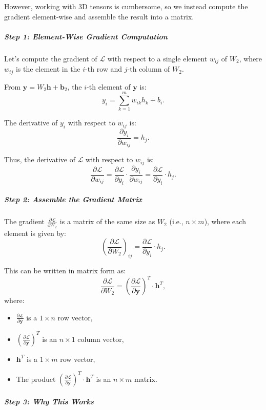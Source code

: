 \begin{notechapter}
However, working with 3D tensors is cumbersome, so we instead compute the gradient element-wise and assemble the result into a matrix.

\subparagraph*{Step 1: Element-Wise Gradient Computation}
Let’s compute the gradient of \( \mathcal{L} \) with respect to a single element \( w_{ij} \) of \( W_2 \), where \( w_{ij} \) is the element in the \( i \)-th row and \( j \)-th column of \( W_2 \).

From \( \mathbf{y} = W_2 \mathbf{h} + \mathbf{b}_2 \), the \( i \)-th element of \( \mathbf{y} \) is:
\[
y_i = \sum_{k=1}^m w_{ik} h_k + b_i.
\]

The derivative of \( y_i \) with respect to \( w_{ij} \) is:
\[
\frac{\partial y_i}{\partial w_{ij}} = h_j.
\]

Thus, the derivative of \( \mathcal{L} \) with respect to \( w_{ij} \) is:
\[
\frac{\partial \mathcal{L}}{\partial w_{ij}} = \frac{\partial \mathcal{L}}{\partial y_i} \cdot \frac{\partial y_i}{\partial w_{ij}} = \frac{\partial \mathcal{L}}{\partial y_i} \cdot h_j.
\]

\subparagraph*{Step 2: Assemble the Gradient Matrix}

The gradient \( \frac{\partial \mathcal{L}}{\partial W_2} \) is a matrix of the same size as \( W_2 \) (i.e., \( n \times m \)), where each element is given by:
\[
\left( \frac{\partial \mathcal{L}}{\partial W_2} \right)_{ij} = \frac{\partial \mathcal{L}}{\partial y_i} \cdot h_j.
\]

This can be written in matrix form as:
\[
\frac{\partial \mathcal{L}}{\partial W_2} = \left( \frac{\partial \mathcal{L}}{\partial \mathbf{y}} \right)^T \cdot \mathbf{h}^T,
\]
where:
\begin{itemize}
    \item \( \frac{\partial \mathcal{L}}{\partial \mathbf{y}} \) is a \( 1 \times n \) row vector,
    \item \( \left( \frac{\partial \mathcal{L}}{\partial \mathbf{y}} \right)^T \) is an \( n \times 1 \) column vector,
    \item \( \mathbf{h}^T \) is a \( 1 \times m \) row vector,
    \item The product \( \left( \frac{\partial \mathcal{L}}{\partial \mathbf{y}} \right)^T \cdot \mathbf{h}^T \) is an \( n \times m \) matrix.
\end{itemize}

\subparagraph*{Step 3: Why This Works}


\end{notechapter}
